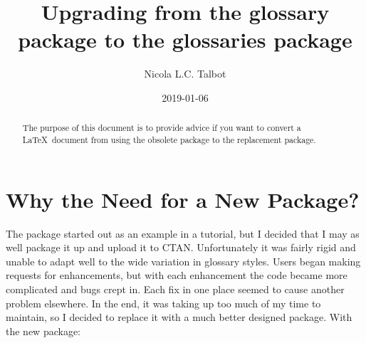 \documentclass{nlctdoc}
\title{Upgrading from the glossary package to the glossaries
package}
\author{Nicola L.C. Talbot}
\date{2019-01-06}
\begin{document}
\maketitle

\begin{abstract}
The purpose of this document is to provide advice if you want to
convert a \LaTeX\ document from using the obsolete 
package to the replacement  package.
\end{abstract}

\tableofcontents

\section{Why the Need for a New Package?}
\label{whyglossaries}

The  package started out as an example in a tutorial,
but I decided that I may as well package it up and upload it to CTAN.
Unfortunately it was fairly rigid and unable to adapt well to the
wide variation in glossary styles. Users began making requests for
enhancements, but with each enhancement the code became more
complicated and bugs crept in. Each fix in one place seemed to cause
another problem elsewhere. In the end, it was taking up too much
of my time to maintain, so I decided to replace it with a much
better designed package. With the new  package:
\end{document}
